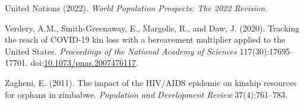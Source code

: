 \documentclass[
  11pt,
  letterpaper,
]{article}
\newlength{\cslhangindent}
\newlength{\cslentryspacingunit} %
\newenvironment{CSLReferences}[2] %
 {%
  \setlength{\parindent}{0pt}
  \ifodd #1
  \let\oldpar\par
  \def\par{\hangindent=\cslhangindent\oldpar}
  \fi
  \setlength{\parskip}{#2\cslentryspacingunit}
 }%
 {}
\begin{document}
\begin{CSLReferences}{1}{0}
\leavevmode{}%
United Nations (2022). \emph{World Population Prospects: The 2022 Revision}.

\leavevmode{}%
Verdery, A.M., Smith-Greenaway, E., Margolis, R., and Daw, J. (2020). Tracking the reach of COVID-19 kin loss with a bereavement multiplier applied to the {U}nited {S}tates. \emph{Proceedings of the National Academy of Sciences} 117(30):17695--17701. doi:\href{https://doi.org/10.1073/pnas.2007476117}{10.1073/pnas.2007476117}.

\leavevmode{}%
Zagheni, E. (2011). The impact of the HIV/AIDS epidemic on kinship resources for orphans in zimbabwe. \emph{Population and Development Review} 37(4):761--783.

\end{CSLReferences}
\end{document}
